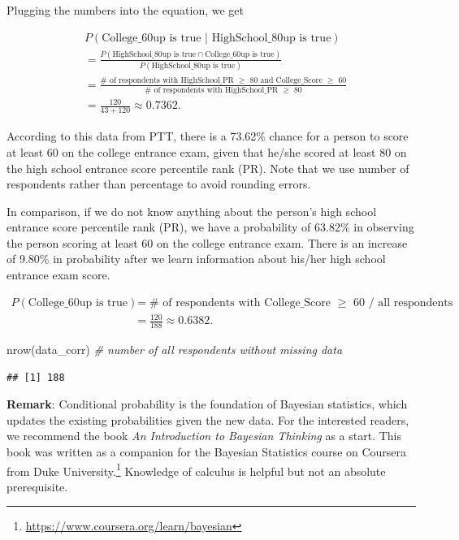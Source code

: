 \documentclass[
]{article}
\newenvironment{Shaded}{\begin{snugshade}}{\end{snugshade}}
\newcommand{\CommentTok}[1]{\textcolor[rgb]{0.56,0.35,0.01}{\textit{#1}}}
\newcommand{\FunctionTok}[1]{\textcolor[rgb]{0.00,0.00,0.00}{#1}}
\newcommand{\NormalTok}[1]{#1}
\begin{document}
Plugging the numbers into the equation, we get

\[\begin{aligned} 
& P(\text{College$\_$60up is true } \vert \text{ HighSchool$\_$80up is true})\\
&= \frac{P(\text{HighSchool$\_$80up is true} \cap \text{College$\_$60up is true})}{P(\text{HighSchool$\_$80up is true})} \\
&= \frac{\text{$\#$ of respondents with HighSchool$\_$PR $\geq$ 80 and College$\_$Score $\geq$ 60}}{\text{$\#$ of respondents with HighSchool$\_$PR $\geq$ 80}} \\
&= \frac{120}{43+120} \approx 0.7362.
\end{aligned}\]

According to this data from PTT, there is a 73.62\% chance for a person
to score at least 60 on the college entrance exam, given that he/she
scored at least 80 on the high school entrance score percentile rank
(PR). Note that we use number of respondents rather than percentage to
avoid rounding errors.

In comparison, if we do not know anything about the person's high school
entrance score percentile rank (PR), we have a probability of 63.82\% in
observing the person scoring at least 60 on the college entrance exam.
There is an increase of 9.80\% in probability after we learn information
about his/her high school entrance exam score.

\[\begin{aligned}
P(\text{College$\_$60up is true}) &= \text{$\#$ of respondents with College$\_$Score $\geq$ 60 / all respondents} \\
&= \frac{120}{188} \approx 0.6382.
\end{aligned}\]

\begin{Shaded}
\begin{Highlighting}[]
\FunctionTok{nrow}\NormalTok{(data\_corr) }\CommentTok{\# number of all respondents without missing data}
\end{Highlighting}
\end{Shaded}

\begin{verbatim}
## [1] 188
\end{verbatim}

\textbf{Remark}: Conditional probability is the foundation of Bayesian
statistics, which updates the existing probabilities given the new data.
For the interested readers, we recommend the book
\textit{An Introduction to Bayesian Thinking}
\citep{clyde2018bayesian101} as a start. This book was written as a
companion for the Bayesian Statistics course on Coursera from Duke
University.\footnote{\url{https://www.coursera.org/learn/bayesian}}
Knowledge of calculus is helpful but not an absolute prerequisite.
\end{document}
